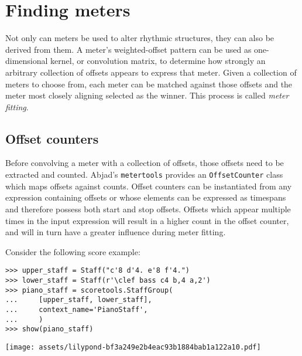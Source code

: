 \section{Finding meters}
\label{sec:finding-meters}

Not only can meters be used to alter rhythmic structures, they can also be
derived from them. A meter's weighted-offset pattern can be used as
one-dimensional kernel, or convolution matrix, to determine how strongly an
arbitrary collection of offsets appears to express that meter. Given a
collection of meters to choose from, each meter can be matched against those
offsets and the meter most closely aligning selected as the winner. This
process is called \emph{meter fitting}.

\subsection{Offset counters} %

Before convolving a meter with a collection of offsets, those offsets need to
be extracted and counted. Abjad's \texttt{metertools} provides an
\texttt{OffsetCounter} class which maps offsets against counts. Offset counters
can be instantiated from any expression containing offsets or whose elements
can be expressed as timespans and therefore possess both start and stop
offsets. Offsets which appear multiple times in the input expression will
result in a higher count in the offset counter, and will in turn have a greater
influence during meter fitting.

Consider the following score example:

\begin{comment}
<abjad>
upper_staff = Staff("c'8 d'4. e'8 f'4.")
lower_staff = Staff(r'\clef bass c4 b,4 a,2')
piano_staff = scoretools.StaffGroup(
    [upper_staff, lower_staff],
    context_name='PianoStaff',
    )
show(piano_staff)
</abjad>
\end{comment}

\begin{abjadbookoutput}
\begin{singlespacing}
\vspace{-0.5\baselineskip}
\begin{verbatim}
>>> upper_staff = Staff("c'8 d'4. e'8 f'4.")
>>> lower_staff = Staff(r'\clef bass c4 b,4 a,2')
>>> piano_staff = scoretools.StaffGroup(
...     [upper_staff, lower_staff],
...     context_name='PianoStaff',
...     )
>>> show(piano_staff)
\end{verbatim}
\noindent\texttt{[image: assets/lilypond-bf3a249e2b4eac93b1884bab1a122a10.pdf]}
\end{singlespacing}
\end{abjadbookoutput}

